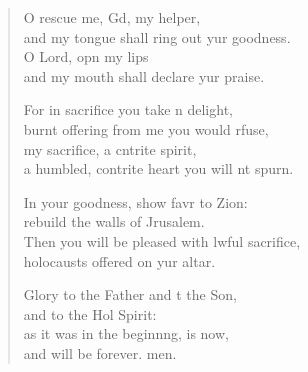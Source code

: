 \begin{verse}
\begin{patverse}
O rescue me, Gd, my helper,\Med\\
and my tongue shall ring out yur goodness.\\
O Lord, opn my lips\Med\\
and my mouth shall declare yur praise.

For in sacrifice you take n delight,\Med\\
burnt offering from me you would rfuse,\\
my sacrifice, a cntrite spirit,\Med\\
a humbled, contrite heart you will nt spurn.

In your goodness, show favr to Zion:\Med\\
rebuild the walls of Jrusalem.\\
Then you will be pleased with lwful sacrifice,\Med\\
holocausts offered on yur altar.

Glory to the Father and t the Son,\Med\\
and to the Hol Spirit:\\
as it was in the beginn\pointup{\i}ng, is now,\Med\\
and will be forever. men.
  \end{patverse}
  \end{verse}

